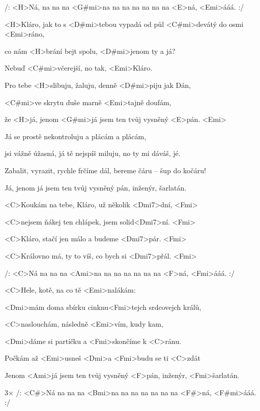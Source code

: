 

/: <H>Ná, na na na <G#mi>na na na na na na na <E>ná, <Emi>ááá. :/

\zs
<H>Kláro, jak to s <D#mi>tebou vypadá od půl <C#mi>devátý do osmi <Emi>ráno,

co nám <H>brání bejt spolu, <D#mi>jenom ty a já?

Nebuď <C#mi>včerejší, no tak, <Emi>Kláro.

Pro tebe <H>slibuju, žaluju, denně <D#mi>piju jak Dán,

<C#mi>ve skrytu duše marně <Emi>tajně doufám,

že <H>já, jenom <G#mi>já jsem ten tvůj vysněný <E>pán. <Emi>
\ks

\zs
Já se prostě nekontroluju a plácám a plácám,

jsi vážně úžasná, já tě nejspíš miluju,
no ty mi dáváš, jé.

Zabalit, vyrazit, rychle frčíme dál,
bereme čáru -- šup do kočáru!

Já, jenom já jsem ten tvůj vysněný pán,
inženýr, šarlatán.
\ks

\zr
<C>Koukám na tebe, Kláro, už několik <Dmi7>dní, <Fmi>

<C>nejsem ňákej ten chlápek, jsem solid<Dmi7>ní. <Fmi>

<C>Kláro, stačí jen málo a budeme <Dmi7>pár. <Fmi>

<C>Královno má, ty to víš, co bych si <Dmi7>přál. <Fmi>
\kr


/: <C>Ná na na na <Ami>na na na na na na na <F>ná, <Fmi>ááá. :/


\zs
<C>Hele, kotě, na co tě <Emi>nalákám:

<Dmi>mám doma sbírku cinknu<Fmi>tejch srdcovejch králů,

<C>naslouchám, následně <Emi>vím, kudy kam,

<Dmi>dáme si partičku a <Fmi>skončíme k <C>ránu.

Počkám až <Emi>usneš <Dmi>a <Fmi>budu se ti <C>zdát

Jenom <Ami>já jsem ten tvůj vysněný <F>pán,
inženýr, <Fmi>šarlatán.
\ks

\zr \kr

3× /: <C#>Ná na na na <Bmi>na na na na na na na <F#>ná, 
<F#mi>ááá. :/

\kp
